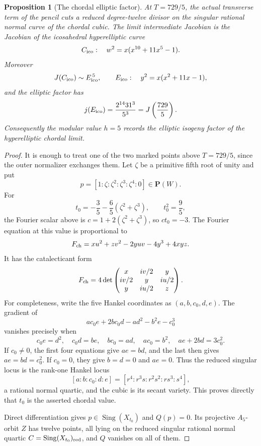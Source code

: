 \documentclass[11pt]{article}
\numberwithin{equation}{section}
\newtheorem{proposition}[theorem]{Proposition}
\theoremstyle{definition}
\theoremstyle{remark}
\newcommand{\PP}{\mathbf P}
\begin{document}
\begin{proposition}[The chordal elliptic factor]\label{prop:chordal-factor}
At \(T=729/5\), the actual transverse term of the pencil cuts a reduced
degree-twelve divisor on the singular rational normal curve of the chordal
cubic.  The limit intermediate Jacobian is the Jacobian of the
icosahedral hyperelliptic curve
\[
 C_{\rm ico}:\quad w^2=x(x^{10}+11x^5-1).
\]
Moreover
\[
 J(C_{\rm ico})\sim E_{\rm ico}^{\,5},
 \qquad
 E_{\rm ico}:\quad y^2=x(x^2+11x-1),
\]
and the elliptic factor has
\[
 j(E_{\rm ico})=\frac{2^{14}31^3}{5^3}
 =J\left(\frac{729}{5}\right).
\]
Consequently the modular value \(h=5\) records the elliptic isogeny factor
of the hyperelliptic chordal limit.
\end{proposition}

\begin{proof}
It is enough to treat one of the two marked points above \(T=729/5\), since
the outer normalizer exchanges them.  Let \(\zeta\) be a primitive fifth root
of unity and put
\[
 p=[1:\zeta:\zeta^2:\zeta^3:\zeta^4:0]\in\PP(W).
\]
For
\[
 t_0=-\frac35-\frac65(\zeta^2+\zeta^3),
 \qquad t_0^2=\frac95,
\]
the Fourier scalar above is
\(c=1+2(\zeta^2+\zeta^3)\), so \(ct_0=-3\).  The Fourier equation at this
value is proportional to
\[
 F_{\rm ch}=xu^2+zv^2-2yuv-4y^3+4xyz.
\]
It has the catalecticant form
\[
 F_{\rm ch}=4\det
 \begin{pmatrix}
 x&iv/2&y\\
 iv/2&y&iu/2\\
 y&iu/2&z
 \end{pmatrix}.
\]
For completeness, write the five Hankel coordinates as \((a,b,c_0,d,e)\).
The gradient of
\[
 ac_0e+2bc_0d-ad^2-b^2e-c_0^3
\]
vanishes precisely when
\[
 c_0e=d^2,\quad c_0d=be,\quad bc_0=ad,\quad ac_0=b^2,
 \quad ae+2bd=3c_0^2.
\]
If \(c_0\ne0\), the first four equations give \(ae=bd\), and the last then
gives \(ae=bd=c_0^2\).  If \(c_0=0\), they give \(b=d=0\) and \(ae=0\).
Thus the reduced singular locus is the rank-one Hankel locus
\[
 [a:b:c_0:d:e]=[r^4:r^3s:r^2s^2:rs^3:s^4],
\]
a rational normal quartic, and the cubic is its secant variety.  This proves
directly that \(t_0\) is the asserted chordal value.

Direct differentiation gives \(p\in\operatorname{Sing}(X_{t_0})\) and \(Q(p)=0\).
Its projective \(A_5\)-orbit \(Z\) has twelve points, all lying on the
reduced singular rational normal quartic
\(C=\operatorname{Sing}(X_{t_0})_{\rm red}\), and \(Q\) vanishes on
all of them.


\end{proof}
\end{document}
